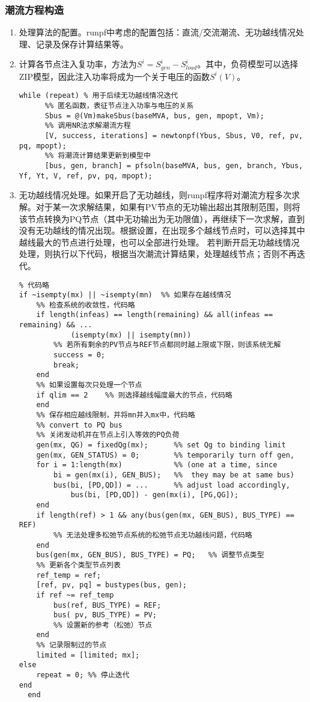 \documentclass[a4paper,12pt]{article}
\begin{document}
    \subsubsection{潮流方程构造}
    \begin{enumerate}
      \item 处理算法的配置。runpf中考虑的配置包括：直流/交流潮流、无功越线情况处理、记录及保存计算结果等。
      \item 计算各节点注入复功率，方法为$S^i=S_{gen}^i-S_{load}^i$。其中，负荷模型可以选择ZIP模型，因此注入功率将成为一个关于电压的函数$S^i(V)$。
      \begin{lstlisting}[style=Matlab-editor,basicstyle=\mlttfamily]
while (repeat) % 用于后续无功越线情况迭代
      %% 匿名函数，表征节点注入功率与电压的关系
      Sbus = @(Vm)makeSbus(baseMVA, bus, gen, mpopt, Vm);
      %% 调用NR法求解潮流方程
      [V, success, iterations] = newtonpf(Ybus, Sbus, V0, ref, pv, pq, mpopt);
      %% 将潮流计算结果更新到模型中
      [bus, gen, branch] = pfsoln(baseMVA, bus, gen, branch, Ybus, Yf, Yt, V, ref, pv, pq, mpopt);
    \end{lstlisting}
      \item 无功越线情况处理。如果开启了无功越线，则runpf程序将对潮流方程多次求解。对于某一次求解结果，如果有PV节点的无功输出超出其限制范围，则将该节点转换为PQ节点（其中无功输出为无功限值），再继续下一次求解，直到没有无功越线的情况出现。根据设置，在出现多个越线节点时，可以选择其中越线最大的节点进行处理，也可以全部进行处理。
      若判断开启无功越线情况处理，则执行以下代码，根据当次潮流计算结果，处理越线节点；否则不再迭代。
    \begin{lstlisting}[style=Matlab-editor,basicstyle=\mlttfamily]
%% 提取所有越线节点，并按照越上限、越下限分别存入mx、mn中。
% 代码略
if ~isempty(mx) || ~isempty(mn)  %% 如果存在越线情况
    %% 检查系统的收敛性，代码略
    if length(infeas) == length(remaining) && all(infeas == remaining) && ...
            (isempty(mx) || isempty(mn))
        %% 若所有剩余的PV节点与REF节点都同时越上限或下限，则该系统无解
        success = 0;
        break;
    end
    %% 如果设置每次只处理一个节点
    if qlim == 2    %% 则选择越线幅度最大的节点，代码略
    end
    %% 保存相应越线限制，并将mn并入mx中，代码略
    %% convert to PQ bus
    %% 关闭发动机并在节点上引入等效的PQ负荷
    gen(mx, QG) = fixedQg(mx);      %% set Qg to binding limit
    gen(mx, GEN_STATUS) = 0;        %% temporarily turn off gen,
    for i = 1:length(mx)            %% (one at a time, since
        bi = gen(mx(i), GEN_BUS);   %%  they may be at same bus)
        bus(bi, [PD,QD]) = ...      %% adjust load accordingly,
            bus(bi, [PD,QD]) - gen(mx(i), [PG,QG]);
    end
    if length(ref) > 1 && any(bus(gen(mx, GEN_BUS), BUS_TYPE) == REF)
        %% 无法处理多松弛节点系统的松弛节点无功越线问题，代码略
    end
    bus(gen(mx, GEN_BUS), BUS_TYPE) = PQ;   %% 调整节点类型
    %% 更新各个类型节点列表
    ref_temp = ref;
    [ref, pv, pq] = bustypes(bus, gen);
    if ref ~= ref_temp
        bus(ref, BUS_TYPE) = REF;
        bus( pv, BUS_TYPE) = PV;
        %% 设置新的参考（松弛）节点
    end
    %% 记录限制过的节点
    limited = [limited; mx];
else
    repeat = 0; %% 停止迭代
end
  end
      \end{lstlisting}
    \end{enumerate}
\end{document}
